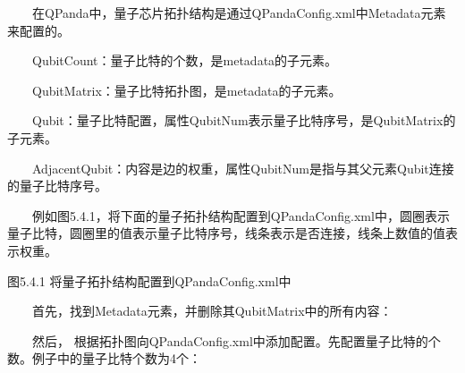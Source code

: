 \documentclass[a4paper,11pt,english]{sphinxmanual}
\begin{document}
\sphinxAtStartPar
  在QPanda中，量子芯片拓扑结构是通过QPandaConfig.xml中Metadata元素来配置的。

\sphinxAtStartPar
{}

\sphinxAtStartPar
  QubitCount：量子比特的个数，是metadata的子元素。

\sphinxAtStartPar
  QubitMatrix：量子比特拓扑图，是metadata的子元素。

\sphinxAtStartPar
  Qubit：量子比特配置，属性QubitNum表示量子比特序号，是QubitMatrix的子元素。

\sphinxAtStartPar
  AdjacentQubit：内容是边的权重，属性QubitNum是指与其父元素Qubit连接的量子比特序号。

\sphinxAtStartPar
  例如图5.4.1，将下面的量子拓扑结构配置到QPandaConfig.xml中，圆圈表示量子比特，圆圈里的值表示量子比特序号，线条表示是否连接，线条上数值的值表示权重。


\begin{center}图5.4.1 将量子拓扑结构配置到QPandaConfig.xml中
\end{center}
\sphinxAtStartPar
  首先，找到Metadata元素，并删除其QubitMatrix中的所有内容：

\begin{sphinxVerbatim}[commandchars=\\\{\}]
    
\end{sphinxVerbatim}

\sphinxAtStartPar
  然后， 根据拓扑图向QPandaConfig.xml中添加配置。先配置量子比特的个数。例子中的量子比特个数为4个：

\begin{sphinxVerbatim}[commandchars=\\\{\}]
    
\end{sphinxVerbatim}
\end{document}
